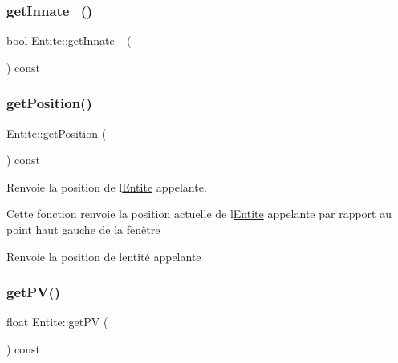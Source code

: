 \subsubsection{\texorpdfstring{get\+Innate\+\_\+()}{getInnate\_()}}
{\footnotesize\ttfamily bool Entite\+::get\+Innate\+\_\+ (\begin{DoxyParamCaption}{ }\end{DoxyParamCaption}) const\hspace{0.3cm}{\ttfamily [inline]}}

\mbox{\label{class_entite_a6f6fd1e1f9f6ad44f0ecc74961a774d9}} 
\subsubsection{\texorpdfstring{get\+Position()}{getPosition()}}
{\footnotesize\ttfamily Entite\+::get\+Position (\begin{DoxyParamCaption}{ }\end{DoxyParamCaption}) const}



Renvoie la position de l\textquotesingle{}\hyperlink{class_entite}{Entite} appelante. 

Cette fonction renvoie la position actuelle de l\textquotesingle{}\hyperlink{class_entite}{Entite} appelante par rapport au point haut gauche de la fenêtre \begin{DoxyReturn}{Renvoie}
la position de l\textquotesingle{}entité appelante 
\end{DoxyReturn}
\mbox{\label{class_entite_aa803a384c574a66d2b104fafd43f189a}} 
\subsubsection{\texorpdfstring{get\+P\+V()}{getPV()}}
{\footnotesize\ttfamily float Entite\+::get\+PV (\begin{DoxyParamCaption}{ }\end{DoxyParamCaption}) const\hspace{0.3cm}{\ttfamily [inline]}}

\mbox{\label{class_entite_a474c3aad164255a66c0c9d39b6e4ed1f}} 
